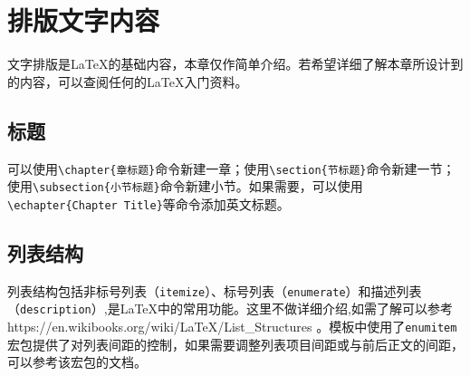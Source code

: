 %
%
%
%
%
%
%

\chapter{排版文字内容}
文字排版是\LaTeX 的基础内容，本章仅作简单介绍。若希望详细了解本章所设计到的内容，可以查阅任何的\LaTeX 入门资料。

\section{标题}
可以使用\verb|\chapter{章标题}|命令新建一章；使用\verb|\section{节标题}|命令新建一节；使用\verb|\subsection{小节标题}|命令新建小节。如果需要，可以使用\verb|\echapter{Chapter Title}|等命令添加英文标题。

\section{列表结构}
列表结构包括非标号列表（\texttt{itemize}）、标号列表（\texttt{enumerate}）和描述列表（\texttt{description}）,是\LaTeX 中的常用功能。这里不做详细介绍,如需了解可以参考https://en.wikibooks.org/wiki/LaTeX/List\_Structures 。模板中使用了\texttt{enumitem}宏包提供了对列表间距的控制，如果需要调整列表项目间距或与前后正文的间距，可以参考该宏包的文档。

